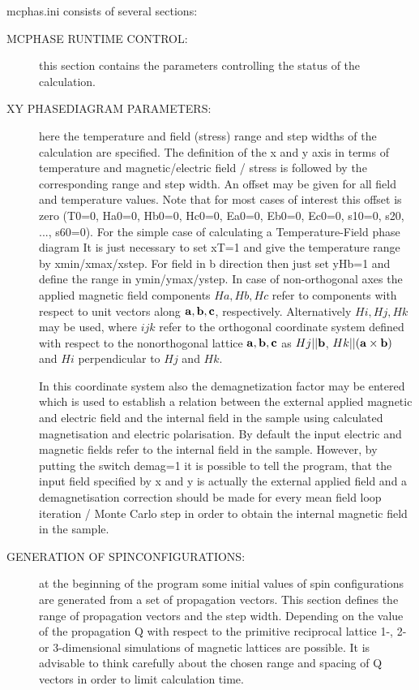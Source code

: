 {\prg mcphas.ini} consists of several sections:
\begin{description}
\item [MCPHASE RUNTIME CONTROL:] this section contains the parameters
controlling the status of the calculation.
\item [XY PHASEDIAGRAM PARAMETERS:] here the temperature and field (stress) range and
step widths of the calculation are specified.
The definition of the x and y
axis in terms of temperature and magnetic/electric field / stress is followed by the
corresponding range and step width. An offset may be given for all
field and temperature values.
Note that for most cases of interest
this offset is zero (T0=0, Ha0=0, Hb0=0, Hc0=0, Ea0=0, Eb0=0, Ec0=0, s10=0, s20, ..., s60=0).
 For the simple case of calculating a Temperature-Field phase diagram
 It is just necessary to set xT=1 and give the temperature range by
xmin/xmax/xstep. For field in b direction then just set yHb=1 and 
define the range in ymin/ymax/ystep.
In case of non-orthogonal axes the applied magnetic field
components $Ha, Hb, Hc$ refer to components with respect to
unit vectors along $\mathbf a,\mathbf b,\mathbf c$, respectively. 
Alternatively $Hi, Hj, Hk$ may be used, where $ijk$ refer to
the orthogonal coordinate system
defined with respect to the nonorthogonal lattice $\mathbf a,\mathbf b,\mathbf c$ as
$Hj||\mathbf b$, $Hk||(\mathbf a \times \mathbf b)$ and $Hi$ perpendicular to $Hj$ and $Hk$.

In this coordinate system also the demagnetization factor may be entered which
is used to establish a relation between the external applied magnetic and electric
field and the internal field in the sample using calculated magnetisation and
electric polarisation. By default the input electric and magnetic fields
refer to the internal field in the sample. However, by putting the switch
 {\prg demag=1} it is possible to tell the program, that the input field specified
by x and y is actually the external applied field and a demagnetisation correction
should be made for every mean field loop iteration / Monte Carlo step
in order to obtain the internal magnetic field in the sample.
\item [GENERATION OF SPINCONFIGURATIONS:] at the beginning of the program
some initial values of spin configurations are generated from a set of 
propagation vectors. This section defines the range of propagation vectors
and the step width.
Depending on the value of the propagation Q with respect to the primitive reciprocal lattice
1-, 2- or 3-dimensional simulations of magnetic lattices
are possible. It is advisable to 
think carefully about the chosen range and spacing of Q vectors in order
to limit calculation time.
 

\end{description}

